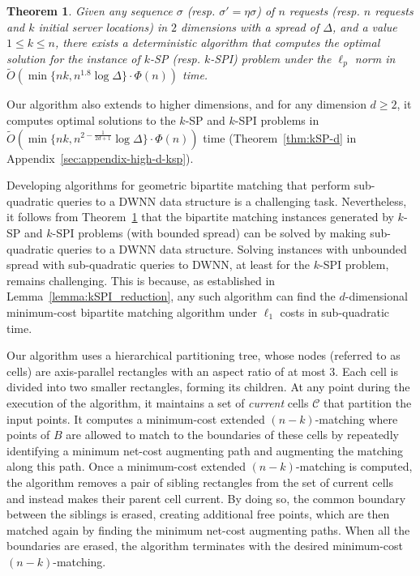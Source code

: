 \documentclass[11pt,onecolumn]{article}
\def\mcC{{\mathcal{C}}}
\newcommand{\servers}{\eta}
\newcommand{\requests}{\sigma}
\newtheorem{theorem}[lemma]{Theorem}
\begin{document}
%

%


\begin{theorem}\label{thm:kSP}
Given any sequence $\requests$ (resp. $\requests'=\servers\requests$) of $n$ requests (resp. $n$ requests and $k$ initial server locations) in $2$ dimensions with a spread of $\Delta$, and a value $1 \le k \le n$, there exists a deterministic algorithm that computes the optimal solution for the instance of $k$-SP (resp. $k$-SPI) problem under the $\ell_p$ norm in $\tilde{O}(\min\{nk, n^{1.8}\log \Delta\}\cdot\Phi(n))$ time.
\end{theorem}


Our algorithm also extends to higher dimensions, and for any dimension $d\ge 2$, it computes optimal solutions to the $k$-SP and $k$-SPI problems in $\tilde{O}(\min\{nk, n^{2-\frac{1}{2d+1}}\log \Delta\}\cdot\Phi(n))$ time (Theorem~\ref{thm:kSP-d} in Appendix~\ref{sec:appendix-high-d-ksp}). 
%

%

%
%
%


Developing algorithms for geometric bipartite matching that perform sub-quadratic queries to a DWNN data structure is a challenging task. Nevertheless, it follows from Theorem~\ref{thm:kSP} that the bipartite matching instances generated by $k$-SP and $k$-SPI problems (with bounded spread) can be solved by making sub-quadratic queries to a DWNN data structure. Solving instances with unbounded spread with sub-quadratic queries to DWNN, at least for the $k$-SPI problem, remains challenging. This is because, as established in Lemma~\ref{lemma:kSPI_reduction}, any such  
algorithm can find the $d$-dimensional minimum-cost bipartite matching algorithm under $\ell_1$ costs in sub-quadratic time.  

%
%
%
%

Our algorithm uses a hierarchical partitioning tree, whose nodes (referred to as cells) are axis-parallel rectangles with an aspect ratio of at most $3$. Each cell is divided into two smaller rectangles, forming its children. At any point during the execution of the algorithm, it maintains a set of \emph{current} cells $\mcC$ that partition the input points. It computes a minimum-cost extended $(n-k)$-matching where points of $B$ are allowed to match to the boundaries of these cells by repeatedly identifying a minimum net-cost augmenting path and augmenting the matching along this path.  Once a minimum-cost extended $(n-k)$-matching is computed, the algorithm removes a pair of sibling rectangles from the set of current cells and instead makes their parent cell current. By doing so, the common boundary between the siblings is erased, creating additional free points, which are then matched again by finding the minimum net-cost augmenting paths. When all the boundaries are erased, the algorithm terminates with the desired minimum-cost $(n-k)$-matching. 
\end{document}
